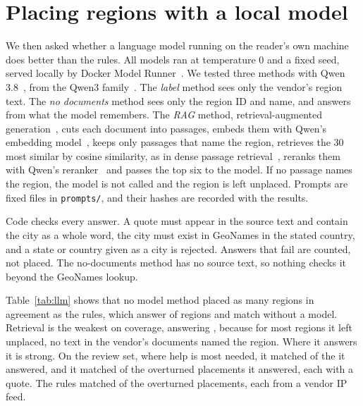 \documentclass[10pt,twocolumn]{article}
\newcommand{\code}[1]{\texttt{#1}}
\begin{document}
\section{Placing regions with a local model}
\label{sec:llm}

We then asked whether a language model running on the reader's own machine does better than the rules. All models ran at temperature 0 and a fixed seed, served locally by Docker Model Runner~\citep{docker_model_runner}. We tested three methods with Qwen 3.8~\citep{hf_qwen38}, from the Qwen3 family~\citep{yang2025qwen3}. The \emph{label} method sees only the vendor's region text. The \emph{no documents} method sees only the region ID and name, and answers from what the model remembers. The \emph{RAG} method, retrieval-augmented generation~\citep{lewis2020rag}, cuts each document into passages, embeds them with Qwen's embedding model~\citep{zhang2025qwen3embedding}, keeps only passages that name the region, retrieves the 30 most similar by cosine similarity, as in dense passage retrieval~\citep{karpukhin2020dense}, reranks them with Qwen's reranker~\citep{zhang2025qwen3embedding,nogueira2019passage} and passes the top six to the model. If no passage names the region, the model is not called and the region is left unplaced. Prompts are fixed files in \code{prompts/}, and their hashes are recorded with the results.

Code checks every answer. A quote must appear in the source text and contain the city as a whole word, the city must exist in GeoNames in the stated country, and a state or country given as a city is rejected. Answers that fail are counted, not placed. The no-documents method has no source text, so nothing checks it beyond the GeoNames lookup.

\begin{table}[tp]
\centering
\small

\caption{Agreement with the reference placements within 50~km. Each match column gives matches out of answers given in that group. The review set is the \llmRulesReviewRegions{} regions the rules send to review, and overturned is the \llmRulesTurnedRegions{} placements changed by hand after reading evidence. The last column counts regions each method matched that the rules did not.}
\label{tab:llm}
\end{table}

Table~\ref{tab:llm} shows that no model method placed as many regions in agreement as the rules, which answer \llmRulesAnswered{} of \llmRulesRegions{} regions and match \llmRulesMatched{} without a model. Retrieval is the weakest on coverage, answering \llmRagAnswered{}, because for most regions it left unplaced, no text in the vendor's documents named the region. Where it answers it is strong. On the review set, where help is most needed, it matched \llmRagReviewMatched{} of the \llmRagReviewAnswered{} it answered, and it matched \llmRagTurnedMatched{} of the \llmRagTurnedAnswered{} overturned placements it answered, each with a quote. The rules matched \llmRulesTurnedMatched{} of the overturned placements, each from a vendor IP feed.
\end{document}
